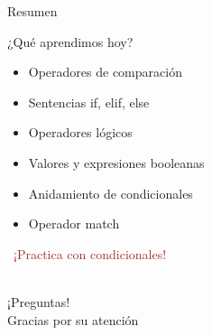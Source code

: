 \documentclass{beamer}
\begin{document}
\begin{frame}{Resumen \ \faListUl}
\begin{conceptbox}{¿Qué aprendimos hoy?}
\small
\begin{itemize}
    \item[\faCheck] Operadores de comparación
    \item[\faCheck] Sentencias if, elif, else
    \item[\faCheck] Operadores lógicos
    \item[\faCheck] Valores y expresiones booleanas
    \item[\faCheck] Anidamiento de condicionales
    \item[\faCheck] Operador match
\end{itemize}
\end{conceptbox}

\vspace{0.3cm}
\begin{center}
\large\textcolor{brown}{\faCode \ ¡Practica con condicionales!}
\end{center}
\end{frame}

\begin{frame}
\begin{center}
\Huge\textcolor{brown}{\faQuestionCircle}\\
\vspace{0.5cm}
\Huge ¡Preguntas!\\
\vspace{1cm}
\Large\textcolor{brownbright}{Gracias por su atención}
\end{center}
\end{frame}
\end{document}
